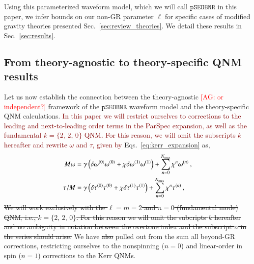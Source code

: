 \documentclass[twocolumn,
               prd,
               aps,
               superscriptaddress,
               tightenlines,
               nofootinbib,
               eqsecnum,
               amsfonts,
               amsmath,
               longbibliography]{revtex4-1}
\newcommand{\pSEOB}{\texttt{pSEOBNR}}
\newcommand{\agcomm}[1]{{\textcolor{red}{{[AG: #1]}} }}
\newcommand{\ag}[1]{{\textcolor{Maroon}{{#1}} }}
\newcommand{\hs}[1]{{\textcolor{blue}{{[HS: #1]}} }}
\begin{document}
Using this parameterized waveform model, which we will call $\pSEOB$ in this
paper, we infer bounds on our non-GR parameter $\ell$ for specific cases of
modified gravity theories presented Sec.~\ref{sec:review_theories}.
%
We detail these results in Sec.~\ref{sec:results}.
%
%
%



\subsection{From theory-agnostic to theory-specific QNM results}
\label{sec:theory_specific_qnm}

Let us now establish the connection between the theory-agnostic \agcomm{or independent?} framework of the
$\pSEOB$ waveform model and the theory-specific QNM calculations.  \ag{In this paper we will restrict ourselves to
corrections to the leading and next-to-leading order terms in the ParSpec expansion, as well as the fundamental 
$k = \{2,\, 2,\, 0\}$ QNM. For this reason,  we will omit the subscripts $k$ hereafter 
and rewrite $\omega$ and $\tau$, given by} Eqs.~\eqref{eq:kerr_expansion} as,
%
\begin{subequations}
\label{eq:qnm_nongr_iso}
\begin{align}
    M \omega &= \gamma \left( \delta\omega^{(0)} \omega^{(0)} + \chi \delta\omega^{(1)} \omega^{(1)} \right)
    + \sum_{n=0}^{N_{\rm max}} \chi^{n} \omega^{(n)} \,,
\\
    \tau/M   &= \gamma \left( \delta\tau^{(0)} \tau^{(0)} + \chi \delta\tau^{(1)} \tau^{(1)} \right)
    + \sum_{n=0}^{N_{\rm max}} \chi^{n} \tau^{(n)}\,,
\end{align}
\end{subequations}
%
\sout{We will work exclusively with the $\ell = m = 2$ and $n = 0$ (fundamental mode)
QNM, i.e., $k = \{2,\, 2,\, 0\}$. For this reason we will omit the subcripts
$k$ hereafter and no ambiguity in notation between the overtone index and the
subscript $n$ in the series should arise.}
%
We have \sout{also} pulled out from the sum all beyond-GR corrections, restricting
ourselves to the nonspinning ($n=0$) and linear-order in spin ($n=1$)
corrections to the Kerr QNMs.
%
\end{document}
